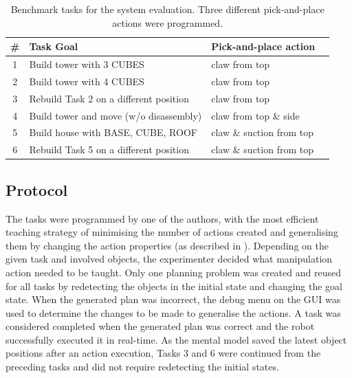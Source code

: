 \begin{table}[h]
	\begin{center}
		\caption{Benchmark tasks for the system evaluation. Three different pick-and-place actions were programmed.}
		\label{table:task-list}
		\begin{tabular}{clll}
			\# & Task Goal & Pick-and-place action\\ \hline
			1 & Build tower with 3 CUBES & claw from top \\
			2 & Build tower with 4 CUBES & claw from top \\
			3 & Rebuild Task 2 on a different position & claw from top \\
			4 & Build tower and move (w/o disassembly) & claw from top \& side \\
			5 & Build house with BASE, CUBE, ROOF & claw \& suction from top \\
			6 & Rebuild Task 5 on a different position & claw \& suction from top \\
		\end{tabular}
	\end{center}
\end{table}

\subsection{Protocol}
The tasks were programmed by one of the authors, with the most efficient teaching strategy of minimising the number of actions created and generalising them by changing the action properties (as described in ).
Depending on the given task and involved objects, the experimenter decided what manipulation action needed to be taught.
Only one planning problem was created and reused for all tasks by redetecting the objects in the initial state and changing the goal state.
When the generated plan was incorrect, the debug menu on the GUI was used to determine the changes to be made to generalise the actions.
A task was considered completed when the generated plan was correct and the robot successfully executed it in real-time.
As the mental model saved the latest object positions after an action execution, Tasks 3 and 6 were continued from the preceding tasks and did not require redetecting the initial states. 



